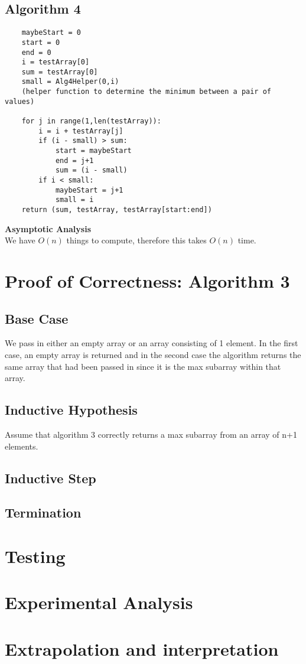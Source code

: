 \documentclass[11pt,letterpaper]{article}
\begin{document}
\subsection{Algorithm 4}
\begin{verbatim}
    maybeStart = 0
    start = 0
    end = 0
    i = testArray[0]
    sum = testArray[0]
    small = Alg4Helper(0,i) 
    (helper function to determine the minimum between a pair of values)

    for j in range(1,len(testArray)):
        i = i + testArray[j]
        if (i - small) > sum:
            start = maybeStart
            end = j+1
            sum = (i - small)
        if i < small:
            maybeStart = j+1
            small = i
    return (sum, testArray, testArray[start:end])
\end{verbatim}
\textbf{Asymptotic Analysis}\\
We have $O(n)$ things to compute, therefore this takes $O(n)$ time.


\section{Proof of Correctness: Algorithm 3}
\subsection*{Base Case}
We pass in either an empty array or an array consisting of 1 element. In the first case, an empty array is returned and in the second case the algorithm returns the same array that had been passed in since it is the max subarray within that array.

\subsection*{Inductive Hypothesis}
Assume that algorithm 3 correctly returns a max subarray from an array of n+1 elements.

\subsection*{Inductive Step}

\subsection*{Termination}

\section{Testing}


\section{Experimental Analysis}


\section{Extrapolation and interpretation}
\end{document}
